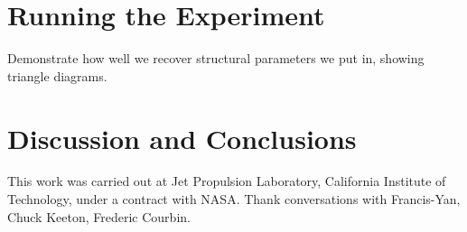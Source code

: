 \documentclass{emulateapj}
\begin{document}
\section{Running the Experiment}\label{}

Demonstrate how well we recover structural parameters we put in, showing triangle diagrams.


\section{Discussion and Conclusions}\label{sec:disc}

\acknowledgements

This work was carried out at Jet Propulsion Laboratory, California
Institute of Technology, under a contract with NASA.  Thank conversations with Francis-Yan, Chuck Keeton, Frederic Courbin. 




\end{document}

